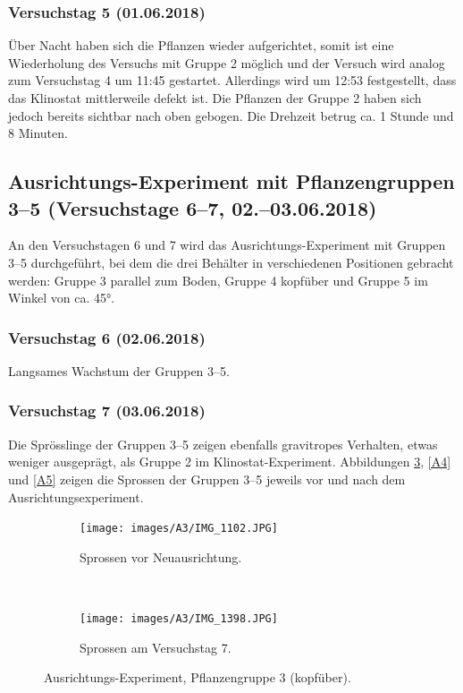 \documentclass[
11pt, 
ngerman,
listof=totocnumbered,
oneside,
bibliography=totocnumbered,
abstracton
]{scrreprt}
\begin{document}
\subsubsection{Versuchstag 5 (01.06.2018)} 

Über Nacht haben sich die Pflanzen wieder aufgerichtet, somit ist eine Wiederholung des Versuchs mit Gruppe 2 möglich und der Versuch wird analog zum Versuchstag 4 um 11:45 gestartet. Allerdings wird um 12:53 festgestellt, dass das Klinostat mittlerweile defekt ist. Die Pflanzen der Gruppe 2 haben sich jedoch bereits sichtbar nach oben gebogen. Die Drehzeit betrug ca. 1 Stunde und 8 Minuten.

\subsection{Ausrichtungs-Experiment mit Pflanzengruppen 3--5 (Versuchstage 6--7, 02.--03.06.2018)} 

An den Versuchstagen 6 und 7 wird das Ausrichtungs-Experiment mit Gruppen 3--5 durchgeführt, bei dem die drei Behälter in verschiedenen Positionen gebracht werden: Gruppe 3 parallel zum Boden, Gruppe 4 kopfüber und Gruppe 5 im Winkel von ca. \ang{45}.

\subsubsection{Versuchstag 6 (02.06.2018)} 

Langsames Wachstum der Gruppen 3--5. 

\subsubsection{Versuchstag 7 (03.06.2018)} 

Die Sprösslinge der Gruppen 3--5 zeigen ebenfalls gravitropes Verhalten, etwas weniger ausgeprägt, als Gruppe 2 im Klinostat-Experiment. Abbildungen \ref{A3}, \ref{A4} und \ref{A5} zeigen die Sprossen der Gruppen 3--5 jeweils vor und nach dem Ausrichtungsexperiment.  


\begin{figure}[H]
	\centering
	\begin{subfigure}[b]{0.44\textwidth}
		\texttt{[image: images/A3/IMG\_1102.JPG]}
		\caption{Sprossen vor Neuausrichtung.\label{A31}}
		
	\end{subfigure}
	~ %
	\begin{subfigure}[b]{0.44\textwidth}
		\texttt{[image: images/A3/IMG\_1398.JPG]}
		\caption{Sprossen am Versuchstag 7.\label{A37}}
	\end{subfigure}
	\caption{Ausrichtungs-Experiment, Pflanzengruppe 3 (kopfüber).\label{A3}}
\end{figure}
\end{document}
